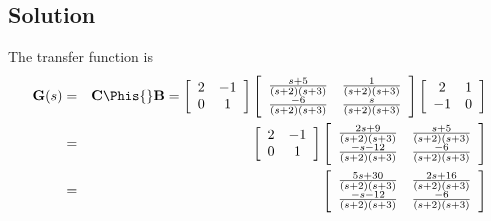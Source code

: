 \subsection*{Solution}
The transfer
function is \begin{eqnarray*}
\mathbf{G}(s)&=&\mathbf{C}\Phis{}\mathbf{B} =
\left[\begin{array}{cc}
  2 & -1 \\
  0 & 1
\end{array}\right]
\left[\begin{array}{cc}
  \frac{s+5}{(s+2)(s+3)} & \frac{1}{(s+2)(s+3)} \\
  \frac{-6}{(s+2)(s+3)} & \frac{s}{(s+2)(s+3)}
\end{array}\right]\left[\begin{array}{cc}
  2 & 1 \\
 -1 & 0
\end{array}\right]\\
&=&\left[\begin{array}{cc}
  2 & -1 \\
  0 & 1
\end{array}\right]
\left[\begin{array}{cc}
  \frac{2s+9}{(s+2)(s+3)} & \frac{s+5}{(s+2)(s+3)} \\
  \frac{-s-12}{(s+2)(s+3)} & \frac{-6}{(s+2)(s+3)}
\end{array}\right]\\
&=& \left[\begin{array}{cc}
  \frac{5s+30}{(s+2)(s+3)} & \frac{2s+16}{(s+2)(s+3)} \\
   \frac{-s-12}{(s+2)(s+3)} & \frac{-6}{(s+2)(s+3)}
\end{array}\right]
\end{eqnarray*}

